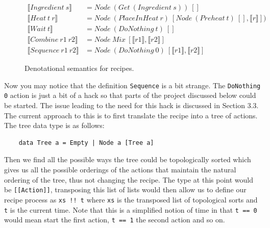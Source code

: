\documentclass[11pt]{article}
\begin{document}
    \newpage

    \begin{figure}[ht]
        \centering\small
            \begin{align*}
            \llbracket Ingredient \: s \rrbracket &= Node \: (Get \: (Ingredient \: s)) \: [] \\
            \llbracket Heat \: t \: r \rrbracket &= Node \:(PlaceInHeat \: r) \:
                [Node \: (Preheat \: t) \: [], \llbracket r \rrbracket]) \\
            \llbracket Wait \: t \rrbracket &= Node \: (DoNothing \: t) \: [] \\
            \llbracket Combine \: r1 \: r2 \rrbracket &=
                Node \: Mix \: [\llbracket r1 \rrbracket , \llbracket r2 \rrbracket] \\
            \llbracket Sequence \: r1 \: r2 \rrbracket &=
                Node \: (DoNothing \: 0) \: [\llbracket r1 \rrbracket , \llbracket r2 \rrbracket]
            \end{align*}
        \caption{Denotational semantics for recipes.}
    \end{figure}

    Now you may notice that the definition \texttt{Sequence} is a bit strange. The
    \texttt{DoNothing 0} action is just a bit of a hack so that parts of the project
    discussed below could be started. The issue leading to the need for this hack
    is discussed in Section 3.3. \\
        
    The current approach to this is to first translate the recipe into a tree of actions.
    The tree data type is as follows: \\
    \begin{tt}
    \small
    \begin{lstlisting}
    data Tree a = Empty | Node a [Tree a]
    \end{lstlisting}
    \end{tt}

    Then we find all the possible ways the tree could be topologically sorted which
    gives us all the possible orderings of the actions that maintain the natural
    ordering of the tree, thus not changing the recipe. The type at this point would
    be \texttt{[[Action]]}, transposing this list of lists would then allow us to
    define our recipe process as \texttt{xs !! t} where \texttt{xs} is the transposed
    list of topological sorts and \texttt{t} is the current time. Note that this
    is a simplified notion of time in that \texttt{t == 0} would mean start the first
    action, \texttt{t == 1} the second action and so on.
\end{document}

